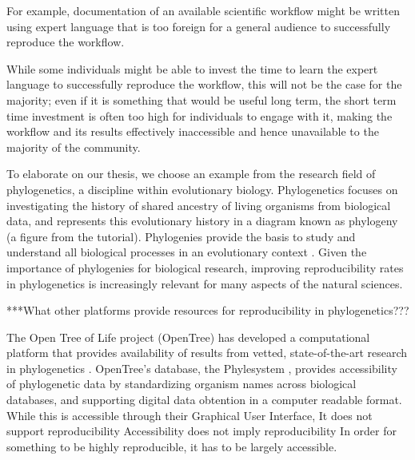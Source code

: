 \documentclass[12pt]{article}
\begin{document}
{{      For example, documentation of an
      available scientific workflow might be written using expert language that is too foreign
      for a general audience to successfully reproduce the workflow.

      While some individuals might
      be able to invest the time to learn the expert language to successfully reproduce
      the workflow, this will not be the case for the majority; even if it is
      something that would be useful long term, the short term time investment
      is often too high for individuals to engage with it, making the workflow and its results
      effectively inaccessible and hence unavailable to the majority of the community.
    }%
}
\bigskip


To elaborate on our thesis,
we choose an example from the research field of phylogenetics,
a discipline within evolutionary biology. Phylogenetics focuses
on investigating the history of shared ancestry of living organisms from biological data,
and represents
this evolutionary history in a diagram known as phylogeny (a figure from the tutorial).
Phylogenies provide the
basis to study and understand all biological processes in an evolutionary context
\citep{dobzhansky1973nothing}.
Given the importance of phylogenies for biological research, improving reproducibility rates
in phylogenetics is increasingly relevant for many aspects of the natural sciences.

***What other platforms provide resources for reproducibility in phylogenetics???

The Open Tree of Life project (OpenTree) has developed a computational platform that provides
availability of results from vetted, state-of-the-art research in phylogenetics
\citep{opentreeoflife2019synth}.
OpenTree's database, the Phylesystem \citep{mctavish2015phylesystem}, provides
accessibility of phylogenetic data by standardizing organism names across biological databases,
and supporting digital data obtention in a computer readable format.
While this is accessible through their Graphical User Interface,
It does not support reproducibility
Accessibility does not imply reproducibility
In order for something to be highly reproducible, it has to be largely accessible.
\end{document}
